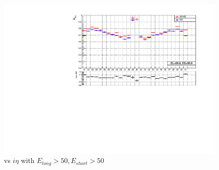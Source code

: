 \begin{figure}[h!]
\centering
\includegraphics[width=0.6\linewidth]{../Figures/Chap2/ImageFiles_HF/Ratio/DataMC/DataMCRIeta5050}
\caption{\ratiosl vs $i\eta$ with $E_{long}>50,E_{short}>50$}
\label{fig:DataMCRIeta5050}
\end{figure}

